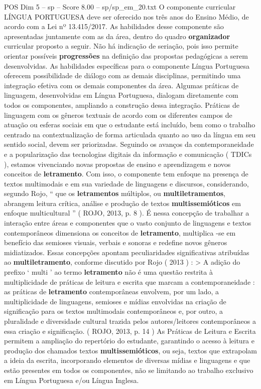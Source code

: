 \begin{textsample}{POS Dim 5 – sp – Score 8.00 – sp/sp\_em\_20.txt}  \label{ex:f5_pos_072}
O componente curricular LÍNGUA PORTUGUESA deve ser oferecido nos três anos do Ensino Médio, de acordo com a Lei nº 13.415/2017.
As habilidades desse componente são apresentadas juntamente com as da área, dentro do quadro \textbf{organizador} curricular proposto a seguir.
Não há indicação de seriação, pois isso permite orientar possíveis \textbf{progressões} na definição das propostas pedagógicas a serem desenvolvidas.
As habilidades específicas para o componente Língua Portuguesa oferecem possibilidade de diálogo com as demais disciplinas, permitindo uma integração efetiva com os demais componentes da área.
Algumas práticas de linguagem, desenvolvidas em Língua Portuguesa, dialogam diretamente com todos os componentes, ampliando a construção dessa integração.
Práticas de linguagem com os gêneros textuais de acordo com os diferentes campos de atuação ou esferas sociais em que o estudante está incluído, bem como o trabalho centrado na contextualização de forma articulada quanto ao uso da língua em seu sentido social, devem ser priorizadas.
Seguindo os avanços da contemporaneidade e a popularização das tecnologias digitais da informação e comunicação ( TDICs ), estamos vivenciando novas propostas de ensino e aprendizagem e novos conceitos de \textbf{letramento}.
Com isso, o componente tem enfoque na presença de textos multimodais e em sua variedade de linguagens e discursos, considerando, segundo Rojo, “ que os \textbf{letramentos} múltiplos, ou \textbf{multiletramentos}, abrangem leitura crítica, análise e produção de textos \textbf{multissemióticos} em enfoque multicultural ” ( ROJO, 2013, p. 8 ).
É nessa concepção de trabalhar a interação entre áreas e componentes que o vasto conjunto de linguagens e textos contemporâneos dimensiona os conceitos de \textbf{letramento}, multiplica -se em benefício das semioses visuais, verbais e sonoras e redefine novos gêneros midiatizados.
Essas concepções apontam peculiaridades significativas atribuídas ao \textbf{multiletramento}, conforme discutido por Rojo ( 2013 ) : > A adição do prefixo ‘ multi ’ ao termo \textbf{letramento} não é uma questão restrita à multiplicidade de práticas de leitura e escrita que marcam a contemporaneidade : as práticas de \textbf{letramento} contemporâneas envolvem, por um lado, a multiplicidade de linguagens, semioses e mídias envolvidas na criação de significação para os textos multimodais contemporâneos e, por outro, a pluralidade e diversidade cultural trazida pelos autores/leitores contemporâneos a essa criação e significação. ( ROJO, 2013, p. 14 ) As Práticas de Leitura e Escrita permitem a ampliação do repertório do estudante, garantindo o acesso à leitura e produção dos chamados textos \textbf{multissemióticos}, ou seja, textos que extrapolam a ideia da escrita, incorporando elementos de diversas mídias e linguagens e que estão presentes em todos os componentes, não se limitando ao trabalho exclusivo em Língua Portuguesa e/ou Língua Inglesa.

\end{textsample}
